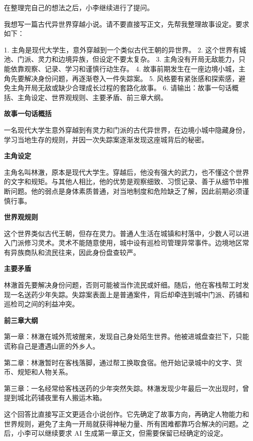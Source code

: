 在整理完自己的想法之后，小李继续进行了提问。

\begin{userbox}
我想写一篇古代异世界穿越小说。请不要直接写正文，先帮我整理故事设定。要求如下：

1. 主角是现代大学生，意外穿越到一个类似古代王朝的异世界。
2. 这个世界有城池、门派、灵力和边境异族，但设定不要太复杂。
3. 主角没有开局无敌能力，只能依靠观察、记录、学习和谨慎行动生存。
4. 故事前期发生在一座边境小城，主角先要解决身份问题，再逐渐卷入一件失踪案。
5. 风格要有紧张感和探索感，避免主角开局无敌或缺少合理成长过程的套路化故事。
6. 请输出：故事一句话概括、主角设定、世界观规则、主要矛盾、前三章大纲。
\end{userbox}

\begin{aibox}
\textbf{故事一句话概括}

一名现代大学生意外穿越到有灵力和门派的古代异世界，在边境小城中隐藏身份，学习当地生存的规则，并因一次失踪案逐渐发现这座城背后的秘密。

\textbf{主角设定}

主角名叫林澈，原本是现代大学生。穿越后，他没有强大的武力，也不懂这个世界的文字和规矩。与其他人相比，他的优势是观察细致、习惯记录、善于从细节中推断问题。他的弱点是身体素质普通，对当地制度和危险缺乏了解，因此前期必须谨慎行事。

\textbf{世界观规则}

这个世界类似古代王朝，但存在灵力。普通人生活在城镇和村落中，少数人可以进入门派修习灵术。灵术不能随意使用，城中设有巡检司管理异常事件。边境地区常有异族商队和流民往来，因此身份盘查较严。

\textbf{主要矛盾}

林澈首先要解决身份问题，否则可能被当作流民或奸细。随后，他在客栈帮工时发现一名送药少年失踪。失踪案表面上是普通案件，背后却牵连到城中门派、药铺和巡检司之间的利益冲突。

\textbf{前三章大纲}

第一章：林澈在城外荒坡醒来，发现自己身处陌生世界。他被进城盘查拦下，只能谎称自己是遭遇山匪的外乡人。

第二章：林澈暂时在客栈落脚，通过帮工换取食宿。他开始记录城中的文字、货币、规矩和人物关系。

第三章：一名经常给客栈送药的少年突然失踪。林澈发现少年最后一次出现时，曾提到城北药铺夜里有人搬运木箱。
\end{aibox}

这个回答比直接写正文更适合小说创作。它先确定了故事方向，再确定人物能力和世界规则，避免了主角一开局就获得神秘力量、所有困难都靠巧合解决的问题。之后，小李可以继续要求 AI 生成第一章正文，但需要保留已经确定的设定。

